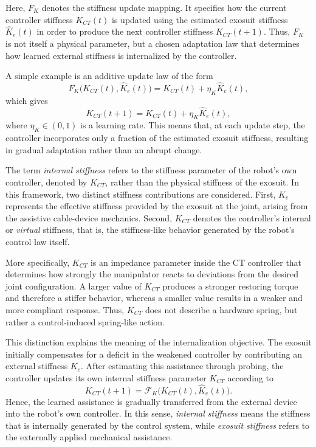 \documentclass[11pt]{article}
\begin{document}
Here, \(F_K\) denotes the stiffness update mapping. It specifies how the current controller stiffness \(K_{CT}(t)\) is updated using the estimated exosuit stiffness \(\hat{K}_e(t)\) in order to produce the next controller stiffness \(K_{CT}(t+1)\). Thus, \(F_K\) is not itself a physical parameter, but a chosen adaptation law that determines how learned external stiffness is internalized by the controller.

A simple example is an additive update law of the form
\begin{equation}
F_K\bigl(K_{CT}(t),\hat{K}_e(t)\bigr)
=
K_{CT}(t)+\eta_K \hat{K}_e(t),
\end{equation}
which gives
\begin{equation}
K_{CT}(t+1)=K_{CT}(t)+\eta_K \hat{K}_e(t),
\end{equation}
where \(\eta_K \in (0,1)\) is a learning rate. This means that, at each update step, the controller incorporates only a fraction of the estimated exosuit stiffness, resulting in gradual adaptation rather than an abrupt change.


The term \emph{internal stiffness} refers to the stiffness parameter of the robot's own controller, denoted by \(K_{CT}\), rather than the physical stiffness of the exosuit. In this framework, two distinct stiffness contributions are considered. First, \(K_e\) represents the effective stiffness provided by the exosuit at the joint, arising from the assistive cable-device mechanics. Second, \(K_{CT}\) denotes the controller's internal or \emph{virtual} stiffness, that is, the stiffness-like behavior generated by the robot's control law itself.

More specifically, \(K_{CT}\) is an impedance parameter inside the CT controller that determines how strongly the manipulator reacts to deviations from the desired joint configuration. A larger value of \(K_{CT}\) produces a stronger restoring torque and therefore a stiffer behavior, whereas a smaller value results in a weaker and more compliant response. Thus, \(K_{CT}\) does not describe a hardware spring, but rather a control-induced spring-like action.

This distinction explains the meaning of the internalization objective. The exosuit initially compensates for a deficit in the weakened controller by contributing an external stiffness \(K_e\). After estimating this assistance through probing, the controller updates its own internal stiffness parameter \(K_{CT}\) according to
\begin{equation}
K_{CT}(t+1)=\mathcal{F}_K\bigl(K_{CT}(t),\hat{K}_e(t)\bigr).
\end{equation}
Hence, the learned assistance is gradually transferred from the external device into the robot's own controller. In this sense, \emph{internal stiffness} means the stiffness that is internally generated by the control system, while \emph{exosuit stiffness} refers to the externally applied mechanical assistance.
\end{document}
